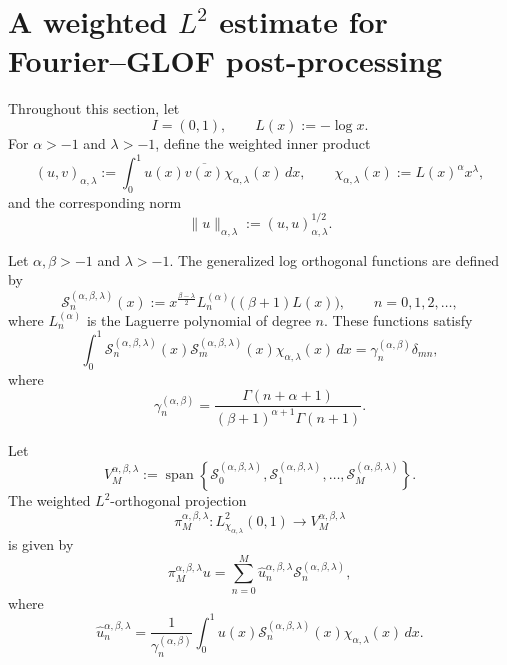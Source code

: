 \documentclass[UTF8]{ctexart}
\begin{document}

%

\section{A weighted $L^2$ estimate for Fourier--GLOF post-processing}

Throughout this section, let
\[
    I=(0,1),\qquad L(x):=-\log x .
\]
For $\alpha>-1$ and $\lambda>-1$, define the weighted inner product
\[
    (u,v)_{\alpha,\lambda}
    :=
    \int_0^1 u(x)\overline{v(x)}
    \chi_{\alpha,\lambda}(x)\,dx,
    \qquad
    \chi_{\alpha,\lambda}(x):=L(x)^\alpha x^\lambda,
\]
and the corresponding norm
\[
    \|u\|_{\alpha,\lambda}
    :=
    (u,u)_{\alpha,\lambda}^{1/2}.
\]

Let $\alpha,\beta>-1$ and $\lambda>-1$. The generalized log orthogonal functions
are defined by
\[
    \mathcal S_n^{(\alpha,\beta,\lambda)}(x)
    :=
    x^{\frac{\beta-\lambda}{2}}
    L_n^{(\alpha)}\bigl((\beta+1)L(x)\bigr),
    \qquad n=0,1,2,\dots,
\]
where $L_n^{(\alpha)}$ is the Laguerre polynomial of degree $n$.
These functions satisfy
\[
    \int_0^1
    \mathcal S_n^{(\alpha,\beta,\lambda)}(x)
    \mathcal S_m^{(\alpha,\beta,\lambda)}(x)
    \chi_{\alpha,\lambda}(x)\,dx
    =
    \gamma_n^{(\alpha,\beta)}\delta_{mn},
\]
where
\[
    \gamma_n^{(\alpha,\beta)}
    =
    \frac{\Gamma(n+\alpha+1)}
    {(\beta+1)^{\alpha+1}\Gamma(n+1)}.
\]

Let
\[
    V_M^{\alpha,\beta,\lambda}
    :=
    \operatorname{span}
    \left\{
    \mathcal S_0^{(\alpha,\beta,\lambda)},
    \mathcal S_1^{(\alpha,\beta,\lambda)},
    \dots,
    \mathcal S_M^{(\alpha,\beta,\lambda)}
    \right\}.
\]
The weighted $L^2$-orthogonal projection
\[
    \pi_M^{\alpha,\beta,\lambda}
    :
    L^2_{\chi_{\alpha,\lambda}}(0,1)
    \longrightarrow
    V_M^{\alpha,\beta,\lambda}
\]
is given by
\[
    \pi_M^{\alpha,\beta,\lambda}u
    =
    \sum_{n=0}^M
    \widehat u_n^{\alpha,\beta,\lambda}
    \mathcal S_n^{(\alpha,\beta,\lambda)},
\]
where
\[
    \widehat u_n^{\alpha,\beta,\lambda}
    =
    \frac{1}{\gamma_n^{(\alpha,\beta)}}
    \int_0^1
    u(x)
    \mathcal S_n^{(\alpha,\beta,\lambda)}(x)
    \chi_{\alpha,\lambda}(x)\,dx .
\]
\end{document}

